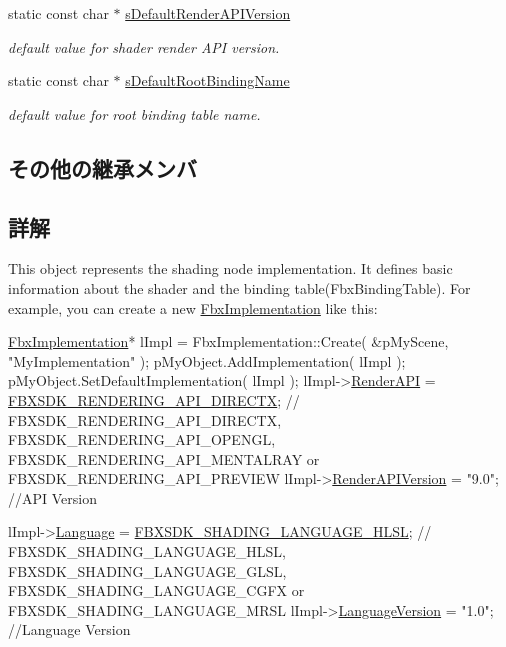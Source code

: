 \begin{DoxyCompactItemize}
static const char $\ast$ \hyperlink{class_fbx_implementation_ac472bad7f7c8705a857f511a189cecf6}{s\+Default\+Render\+A\+P\+I\+Version}
\begin{DoxyCompactList}\small\item\em default value for shader render A\+PI version. \end{DoxyCompactList}\item 
static const char $\ast$ \hyperlink{class_fbx_implementation_ab219e209feeb125961c36ff732ab121b}{s\+Default\+Root\+Binding\+Name}
\begin{DoxyCompactList}\small\item\em default value for root binding table name. \end{DoxyCompactList}\end{DoxyCompactItemize}
\subsection*{その他の継承メンバ}


\subsection{詳解}
This object represents the shading node implementation. It defines basic information about the shader and the binding table(\+Fbx\+Binding\+Table). For example, you can create a new \hyperlink{class_fbx_implementation}{Fbx\+Implementation} like this\+: 
\begin{DoxyCode}
\hyperlink{class_fbx_implementation}{FbxImplementation}* lImpl = FbxImplementation::Create( &pMyScene, \textcolor{stringliteral}{"MyImplementation"} );
pMyObject.AddImplementation( lImpl );
pMyObject.SetDefaultImplementation( lImpl );
lImpl->\hyperlink{class_fbx_implementation_ac127174c10e30bdf28d2e276c7818302}{RenderAPI} = \hyperlink{fbxshadingconventions_8h_a5f0c28ccf711fb886ff3c69e91691ffe}{FBXSDK\_RENDERING\_API\_DIRECTX}; \textcolor{comment}{//
      FBXSDK\_RENDERING\_API\_DIRECTX, FBXSDK\_RENDERING\_API\_OPENGL, FBXSDK\_RENDERING\_API\_MENTALRAY or FBXSDK\_RENDERING\_API\_PREVIEW}
lImpl->\hyperlink{class_fbx_implementation_a66ac67e482f39a4e71389f33f1c69648}{RenderAPIVersion} = \textcolor{stringliteral}{"9.0"}; \textcolor{comment}{//API Version}

lImpl->\hyperlink{class_fbx_implementation_acda7f6c31ffe13c69bd3dbfa972a6fac}{Language} = \hyperlink{fbxshadingconventions_8h_ac10b54a713e5562fe6572d1a2594288f}{FBXSDK\_SHADING\_LANGUAGE\_HLSL}; \textcolor{comment}{//
      FBXSDK\_SHADING\_LANGUAGE\_HLSL, FBXSDK\_SHADING\_LANGUAGE\_GLSL, FBXSDK\_SHADING\_LANGUAGE\_CGFX or FBXSDK\_SHADING\_LANGUAGE\_MRSL}
lImpl->\hyperlink{class_fbx_implementation_aebb544e23225701b6e92cd058bc09bab}{LanguageVersion} = \textcolor{stringliteral}{"1.0"};  \textcolor{comment}{//Language Version}
\end{DoxyCode}



